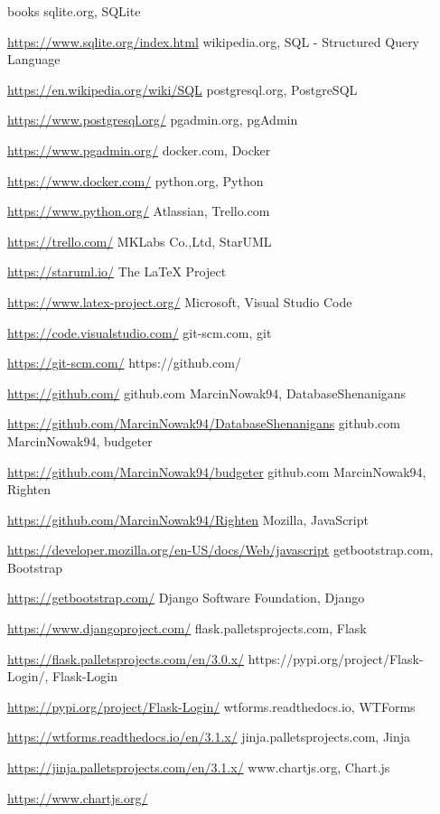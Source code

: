 \documentclass[a4paper,10pt, twoside]{report}
\begin{document}
\begin{large}
\begin{thebibliography} {books}
     sqlite.org, SQLite \raggedright\url{
        https://www.sqlite.org/index.html}
     wikipedia.org, SQL - Structured Query Language \raggedright\url{
        https://en.wikipedia.org/wiki/SQL}
     postgresql.org, PostgreSQL \raggedright\url{
        https://www.postgresql.org/}
     pgadmin.org, pgAdmin \raggedright\url{
        https://www.pgadmin.org/}
     docker.com, Docker \raggedright\url{
        https://www.docker.com/}
     python.org, Python \raggedright\url{
        https://www.python.org/}
     Atlassian, Trello.com \raggedright\url{
        https://trello.com/}
     MKLabs Co.,Ltd, StarUML \raggedright\url{
        https://staruml.io/}
     The LaTeX Project \raggedright\url{
        https://www.latex-project.org/}
     Microsoft, Visual Studio Code \raggedright\url{
        https://code.visualstudio.com/}
     git-scm.com, git \raggedright\url{
        https://git-scm.com/}
     https://github.com/ \raggedright\url{
        https://github.com/}
     github.com MarcinNowak94, DatabaseShenanigans \raggedright\url{
        https://github.com/MarcinNowak94/DatabaseShenanigans}
     github.com MarcinNowak94, budgeter \raggedright\url{
        https://github.com/MarcinNowak94/budgeter}
     github.com MarcinNowak94, Righten \raggedright\url{
        https://github.com/MarcinNowak94/Righten}
     Mozilla, JavaScript \raggedright\url{
        https://developer.mozilla.org/en-US/docs/Web/javascript}
     getbootstrap.com, Bootstrap \raggedright\url{
        https://getbootstrap.com/}
     Django Software Foundation, Django \raggedright\url{
        https://www.djangoproject.com/}
     flask.palletsprojects.com, Flask \raggedright\url{
        https://flask.palletsprojects.com/en/3.0.x/}
     https://pypi.org/project/Flask-Login/, Flask-Login \raggedright\url{
        https://pypi.org/project/Flask-Login/}
     wtforms.readthedocs.io, WTForms \raggedright\url{
        https://wtforms.readthedocs.io/en/3.1.x/}
     jinja.palletsprojects.com, Jinja \raggedright\url{
        https://jinja.palletsprojects.com/en/3.1.x/}
     www.chartjs.org, Chart.js \raggedright\url{
        https://www.chartjs.org/}
\end{thebibliography}

\listoffigures
\listoftables
\lstlistoflistings

\end{large}
\end{document}
